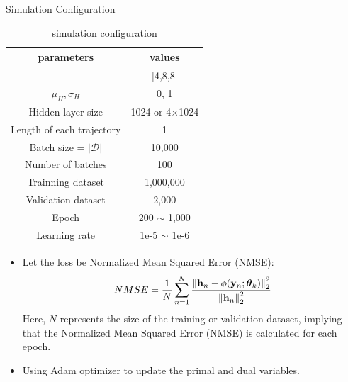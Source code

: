 \documentclass[hyperref={bookmarks=false}]{beamer}
\numberwithin{figure}{section}
\begin{document}
\begin{frame}[allowframebreaks]{Simulation Configuration}

\begin{table}[H] \label{tab:Configuration}
    \centering
    \renewcommand{\arraystretch}{1.2}
    \begin{tabular}{|c|c|}
        \hline
        parameters   &values \\
        \hline \hline
        [$n_R,n_T$,$T$]                 &[4,8,8]        \\ \hline
        $\mu_H, \sigma_H$               &0, 1          \\ \hline
        Hidden layer size               &1024 or 4$\times$1024   \\ \hline
        Length of each trajectory       &1                      \\ \hline
        Batch size = $|\mathcal{D}|$    &10,000         \\ \hline
        Number of batches               &100            \\ \hline
        Trainning dataset               &1,000,000      \\ \hline
        Validation dataset              &2,000          \\ \hline
        Epoch                           &200 $\sim$ 1,000   \\ \hline
        Learning rate                   &1e-5 $\sim$ 1e-6  \\ \hline
    \end{tabular}
    \caption{simulation configuration}
\end{table}

\framebreak

\begin{itemize}
    \item Let the loss be Normalized Mean Squared Error (NMSE):
        \begin{equation} \label{NMSE}
          NMSE=\frac{1}{N} \sum\limits_{n=1}^N
          \frac{\left\| {\bf h}_n-\phi(\mathbf{y}_n;\boldsymbol{\theta}_k) \right\|^2_2}
          {\left\| {\bf h}_n \right\|^2_2}
        \end{equation}
        Here, $N$ represents the size of the training or validation dataset, 
        implying that the Normalized Mean Squared Error (NMSE) is calculated for each epoch.
    \vspace{12pt}
    \item Using Adam optimizer to update the primal and dual variables.
 
\end{itemize}
\end{frame}
\end{document}

